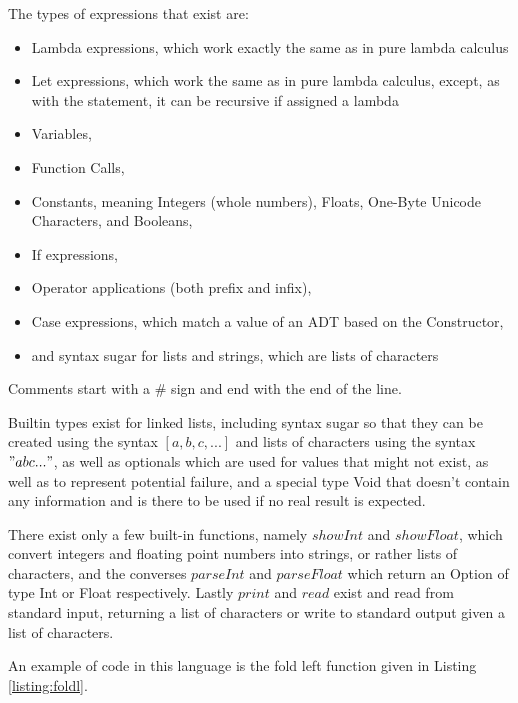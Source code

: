 \documentclass[12pt]{article}
\newcommand{\importListing}[1]{
    \begin{minipage}{\textwidth}
    
    \end{minipage}
}
\begin{document}
The types of expressions that exist are:
\begin{itemize}
	\item Lambda expressions, which work exactly
	      the same as in pure lambda calculus
	\item Let expressions, which work the same as in pure
	      lambda calculus, except, as with the statement,
	      it can be recursive if assigned a lambda
	\item Variables,
	\item Function Calls,
	\item Constants, meaning Integers (whole numbers), Floats,
	      One-Byte Unicode Characters, and Booleans,
	\item If expressions,
	\item Operator applications (both prefix and infix),
	\item Case expressions, which match a value of an ADT
	      based on the Constructor,
	\item and syntax sugar for lists and strings,
	      which are lists of characters
\end{itemize}

Comments start with a $\#$ sign and end with the end of the line.

Builtin types exist for linked lists, including syntax sugar so that
they can be created using the syntax $[a, b, c, ...]$ and lists of characters
using the syntax $"abc..."$, as well as optionals which are used for
values that might not exist, as well as to represent potential failure,
and a special type Void that doesn't contain any information and is there to
be used if no real result is expected.

There exist only a few built-in functions, namely
$showInt$ and $showFloat$, which convert integers and floating point numbers
into strings, or rather lists of characters, and the converses $parseInt$ and
$parseFloat$ which return an Option of type Int or Float respectively.
Lastly $print$ and $read$ exist and read from standard input, returning a list
of characters or write to standard output given a list of characters.

\importListing{code/foldl.tex}

An example of code in this language is the fold left function
given in Listing \ref{listing:foldl}.
\end{document}
